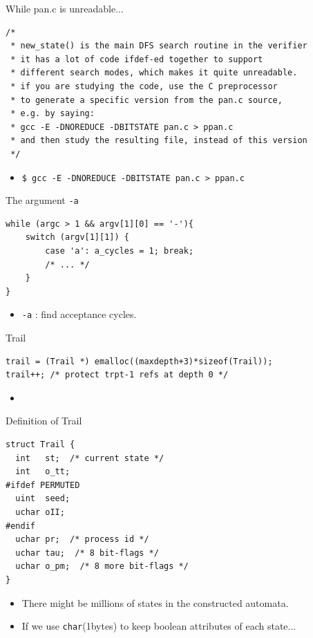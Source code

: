 \documentclass[12pt]{beamer}
\newcommand{\code}[1]{\texttt{#1}}
\begin{document}
\begin{frame}[fragile]{While pan.c is unreadable...}

\begin{lstlisting}[basicstyle=\footnotesize\ttfamily]
/*
 * new_state() is the main DFS search routine in the verifier
 * it has a lot of code ifdef-ed together to support
 * different search modes, which makes it quite unreadable.
 * if you are studying the code, use the C preprocessor
 * to generate a specific version from the pan.c source,
 * e.g. by saying:
 * gcc -E -DNOREDUCE -DBITSTATE pan.c > ppan.c
 * and then study the resulting file, instead of this version
 */\end{lstlisting}
 	\begin{itemize}
 		\item \code{\$ gcc -E -DNOREDUCE -DBITSTATE pan.c > ppan.c}
 	\end{itemize}
\end{frame}


\begin{frame}[fragile]{The argument \code{-a}}
\begin{lstlisting}[basicstyle=\normalsize\ttfamily]
while (argc > 1 && argv[1][0] == '-'){ 
    switch (argv[1][1]) {
        case 'a': a_cycles = 1; break;
        /* ... */
    }
}\end{lstlisting}
 	\begin{itemize}
 		\item \code{-a} : find acceptance cycles.
 	\end{itemize}
\end{frame}  


\begin{frame}[fragile]{Trail}
\begin{lstlisting}[basicstyle=\normalsize\ttfamily]
trail = (Trail *) emalloc((maxdepth+3)*sizeof(Trail));
trail++; /* protect trpt-1 refs at depth 0 */
\end{lstlisting}
 	\begin{itemize}
 		\item ~
 	\end{itemize}
\end{frame}

\begin{frame}[fragile]{Definition of Trail}
\begin{lstlisting}[basicstyle=\normalsize\ttfamily]
struct Trail {
  int   st;  /* current state */
  int   o_tt;
#ifdef PERMUTED
  uint  seed;
  uchar oII;
#endif
  uchar pr;  /* process id */
  uchar tau;  /* 8 bit-flags */
  uchar o_pm;  /* 8 more bit-flags */
}
\end{lstlisting}
\begin{itemize}
	\item There might be millions of states in the constructed automata.
	\item If we use \code{char}(1bytes) to keep boolean attributes of each state...
\end{itemize}
\end{frame}
\end{document}

